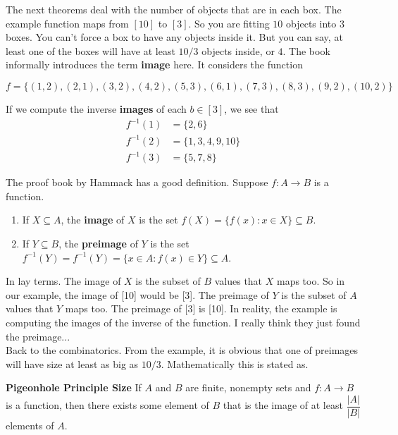 \documentclass{article}
\begin{document}
The next theorems deal with the number of objects that are in each box. The example function maps from $[10]$ to $[3]$. So you are fitting $10$ objects into $3$ boxes. You can't force a box to have any objects inside it. But you can say, at least one of the boxes will have at least $10/3$ objects inside, or $4$. The book informally introduces the term \textbf{image} here. It considers the function

\begin{equation*}
    f = \{(1,2), (2,1), (3,2), (4,2), (5,3), (6,1), (7,3), (8,3), (9,2), (10,2)\}
\end{equation*}

If we compute the inverse \textbf{images} of each $b \in [3]$, we see that
\begin{align*}
    f^{-1}(1) & = \{2, 6\} \\
    f^{-1}(2) & = \{1, 3, 4, 9, 10\} \\
    f^{-1}(3) & = \{5, 7, 8\}
\end{align*}

The proof book by Hammack has a good definition. Suppose $f: A \rightarrow B$ is a function.
\begin{enumerate}
    \item If $X \subseteq A$, the \textbf{image} of $X$ is the set $f(X) = \{f(x): x \in X\} \subseteq B$.
    \item If $Y \subseteq B$, the \textbf{preimage} of $Y$ is the set $f^{-1}(Y) = f^{-1}(Y) = \{x \in A: f(x) \in Y\} \subseteq A$.
\end{enumerate}

In lay terms. The image of $X$ is the subset of $B$ values that $X$ maps too. So in our example, the image of [10] would be [3]. The preimage of $Y$ is the subset of $A$ values that $Y$ maps too. The preimage of [3] is [10]. In reality, the example is computing the images of the inverse of the function. I really think they just found the preimage... \\

Back to the combinatorics. From the example, it is obvious that one of preimages will have size at least as big as $10/3$. Mathematically this is stated as.

\begin{thm}
\textbf{Pigeonhole Principle Size} If $A$ and $B$ are finite, nonempty sets and $f: A \rightarrow B$ is a function, then there exists some element of $B$ that is the image of at least $\dfrac{|A|}{|B|}$ elements of $A$.
\end{thm}
\end{document}
